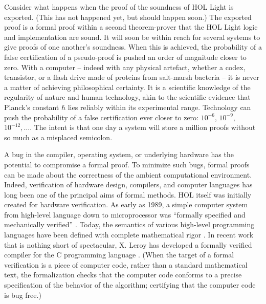 \documentclass{llncs}
\begin{document}
Consider what happens when the proof of the soundness of HOL Light is exported.
(This has not happened yet, but should happen soon.)
The exported proof is a formal proof within a second theorem-prover that the HOL Light logic and implementation are sound.  
It will soon be within reach for several systems to give proofs
of one another's soundness.  When this is achieved, the probability of a false certification
of a pseudo-proof is pushed an order of magnitude closer to zero.  With a computer -- indeed with any physical artefact, whether a codex, transistor, or a flash drive made of proteins from salt-marsh bacteria --
it is never a matter of achieving philosophical certainty.
It is a scientific knowledge of the regularity of nature and human technology, akin to the scientific evidence
that Planck's constant $\hbar$ lies reliably within its experimental range.
Technology can push the probability of a false certification
ever closer to zero: $10^{-6}$, $10^{-9}$, $10^{-12},\ldots$. The intent
is 
that one day a system will store a million proofs without so much as a misplaced
semicolon.

A bug in the compiler, operating system,
or underlying hardware has the potential to compromise a formal proof. 
To minimize such bugs, formal proofs can be made about the
correctness of the ambient
computational environment.
Indeed, verification of hardware design, 
compilers, and computer
languages has long been one of the principal aims of formal methods.
HOL itself was initially created for hardware verification.
As early as 1989, a simple computer system from high-level language down to microprocessor was ``formally specified and mechanically
verified'' \cite{BHMY}.
Today, the semantics of various
high-level programming languages have been defined with complete mathematical
rigor \cite{Harper}.  
In recent work that is nothing short of spectacular, X. Leroy has
developed a formally verified compiler for the C programming
language
\cite{CC}.  
(When
the target of a formal verification is a piece of computer code, rather
than a standard mathematical text, the formalization checks that the
computer code conforms to a precise specification of the behavior
of the algorithm; certifying that the computer code is bug free.)
\end{document}
